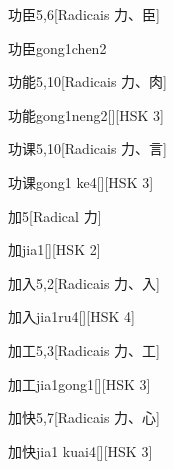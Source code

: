 \begin{entry}{功臣}{5,6}[Radicais ⼒、⾂]
  \begin{phonetics}{功臣}{gong1chen2}
  \end{phonetics}
\end{entry}

\begin{entry}{功能}{5,10}[Radicais ⼒、⾁]
  \begin{phonetics}{功能}{gong1neng2}[][HSK 3]
  \end{phonetics}
\end{entry}

\begin{entry}{功课}{5,10}[Radicais ⼒、⾔]
  \begin{phonetics}{功课}{gong1 ke4}[][HSK 3]
  \end{phonetics}
\end{entry}

\begin{entry}{加}{5}[Radical ⼒]
  \begin{phonetics}{加}{jia1}[][HSK 2]
  \end{phonetics}
\end{entry}

\begin{entry}{加入}{5,2}[Radicais ⼒、⼊]
  \begin{phonetics}{加入}{jia1ru4}[][HSK 4]
  \end{phonetics}
\end{entry}

\begin{entry}{加工}{5,3}[Radicais ⼒、⼯]
  \begin{phonetics}{加工}{jia1gong1}[][HSK 3]
  \end{phonetics}
\end{entry}

\begin{entry}{加快}{5,7}[Radicais ⼒、⼼]
  \begin{phonetics}{加快}{jia1 kuai4}[][HSK 3]
  \end{phonetics}
\end{entry}


